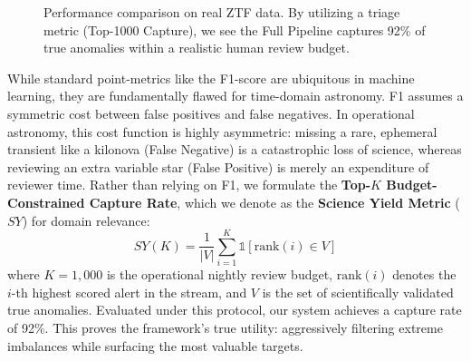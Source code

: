 \documentclass[10pt,journal,compsoc]{IEEEtran}
\begin{document}
\begin{figure}[htbp]
    \centering
    \caption{Performance comparison on real ZTF data. By utilizing a triage metric (Top-1000 Capture), we see the Full Pipeline captures 92\% of true anomalies within a realistic human review budget.}
    \label{fig:comparison}
\end{figure}

While standard point-metrics like the F1-score are ubiquitous in machine learning, they are fundamentally flawed for time-domain astronomy. F1 assumes a symmetric cost between false positives and false negatives. In operational astronomy, this cost function is highly asymmetric: missing a rare, ephemeral transient like a kilonova (False Negative) is a catastrophic loss of science, whereas reviewing an extra variable star (False Positive) is merely an expenditure of reviewer time. Rather than relying on F1, we formulate the \textbf{Top-$K$ Budget-Constrained Capture Rate}, which we denote as the \textbf{Science Yield Metric} ($SY$) for domain relevance:
\begin{equation}
    SY(K) = \frac{1}{|V|} \sum_{i=1}^{K} \mathbb{1}[\text{rank}(i) \in V]
\end{equation}
where $K=1,000$ is the operational nightly review budget, $\text{rank}(i)$ denotes the $i$-th highest scored alert in the stream, and $V$ is the set of scientifically validated true anomalies. Evaluated under this protocol, our system achieves a capture rate of 92\%. This proves the framework's true utility: aggressively filtering extreme imbalances while surfacing the most valuable targets.
\end{document}
